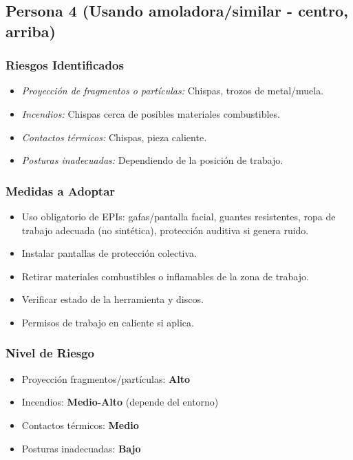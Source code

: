 \documentclass[12pt,a4paper]{article}
\begin{document}
	\bigskip\hrulefill\bigskip
	
	\subsection{Persona 4 (Usando amoladora/similar - centro, arriba)}
	
	\subsubsection{Riesgos Identificados}
	\begin{itemize}
		\item \textit{Proyección de fragmentos o partículas:} Chispas, trozos de metal/muela.
		\item \textit{Incendios:} Chispas cerca de posibles materiales combustibles.
		\item \textit{Contactos térmicos:} Chispas, pieza caliente.
		\item \textit{Posturas inadecuadas:} Dependiendo de la posición de trabajo.
	\end{itemize}
	
	\subsubsection{Medidas a Adoptar}
	\begin{itemize}
		\item Uso obligatorio de EPIs: gafas/pantalla facial, guantes resistentes, ropa de trabajo adecuada (no sintética), protección auditiva si genera ruido.
		\item Instalar pantallas de protección colectiva.
		\item Retirar materiales combustibles o inflamables de la zona de trabajo.
		\item Verificar estado de la herramienta y discos.
		\item Permisos de trabajo en caliente si aplica.
	\end{itemize}
	
	\subsubsection{Nivel de Riesgo}
	\begin{itemize}
		\item Proyección fragmentos/partículas: \textbf{Alto}
		\item Incendios: \textbf{Medio-Alto} (depende del entorno)
		\item Contactos térmicos: \textbf{Medio}
		\item Posturas inadecuadas: \textbf{Bajo}
	\end{itemize}
	
\end{document}
